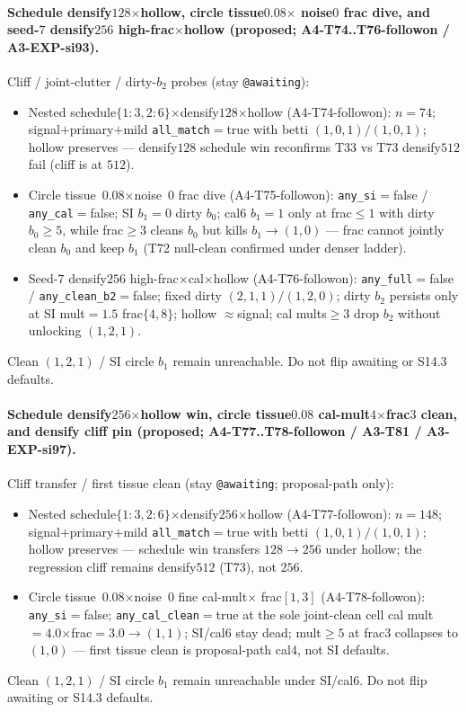 \documentclass[11pt]{article}
\begin{document}
\paragraph{Schedule densify$128$$\times$hollow, circle tissue$0.08$$\times$
noise$0$ frac dive, and seed-$7$ densify$256$ high-frac$\times$hollow
(proposed; A4-T74..T76-followon / A3-EXP-si93).}
Cliff / joint-clutter / dirty-$b_2$ probes (stay \texttt{@awaiting}):
\begin{itemize}[leftmargin=1.5em]
  \item Nested schedule$\{1{:}3,2{:}6\}$$\times$densify$128$$\times$hollow
  (A4-T74-followon): $n{=}74$; signal$+$primary$+$mild
  \texttt{all\_match}${=}$true with betti $(1,0,1)/(1,0,1)$; hollow
  preserves --- densify$128$ schedule win reconfirms T33 vs T73
  densify$512$ fail (cliff is at $512$).
  \item Circle tissue~$0.08$$\times$noise~$0$ frac dive
  (A4-T75-followon): \texttt{any\_si}${=}$false /
  \texttt{any\_cal}${=}$false; SI $b_1{=}0$ dirty $b_0$; cal$6$
  $b_1{=}1$ only at frac$\le 1$ with dirty $b_0\ge 5$, while
  frac$\ge 3$ cleans $b_0$ but kills $b_1\to(1,0)$ --- frac cannot
  jointly clean $b_0$ and keep $b_1$ (T72 null-clean confirmed under
  denser ladder).
  \item Seed-$7$ densify$256$ high-frac$\times$cal$\times$hollow
  (A4-T76-followon): \texttt{any\_full}${=}$false /
  \texttt{any\_clean\_b2}${=}$false; fixed dirty $(2,1,1)/(1,2,0)$;
  dirty $b_2$ persists only at SI mult${=}1.5$ frac$\{4,8\}$; hollow
  $\approx$signal; cal mults$\ge 3$ drop $b_2$ without unlocking
  $(1,2,1)$.
\end{itemize}
Clean $(1,2,1)$ / SI circle $b_1$ remain unreachable. Do not flip
awaiting or S14.3 defaults.

\paragraph{Schedule densify$256$$\times$hollow win, circle tissue$0.08$
cal-mult$4$$\times$frac$3$ clean, and densify cliff pin (proposed;
A4-T77..T78-followon / A3-T81 / A3-EXP-si97).}
Cliff transfer / first tissue clean (stay \texttt{@awaiting};
proposal-path only):
\begin{itemize}[leftmargin=1.5em]
  \item Nested schedule$\{1{:}3,2{:}6\}$$\times$densify$256$$\times$hollow
  (A4-T77-followon): $n{=}148$; signal$+$primary$+$mild
  \texttt{all\_match}${=}$true with betti $(1,0,1)/(1,0,1)$; hollow
  preserves --- schedule win transfers $128\to 256$ under hollow; the
  regression cliff remains densify$512$ (T73), not $256$.
  \item Circle tissue~$0.08$$\times$noise~$0$ fine cal-mult$\times$
  frac$[1,3]$ (A4-T78-followon): \texttt{any\_si}${=}$false;
  \texttt{any\_cal\_clean}${=}$true at the sole joint-clean cell
  cal mult${=}4.0$$\times$frac${=}3.0\to(1,1)$; SI/cal$6$ stay dead;
  mult$\ge 5$ at frac$3$ collapses to $(1,0)$ --- first tissue clean
  is proposal-path cal$4$, not SI defaults.
\end{itemize}
Clean $(1,2,1)$ / SI circle $b_1$ remain unreachable under SI/cal$6$.
Do not flip awaiting or S14.3 defaults.
\end{document}
